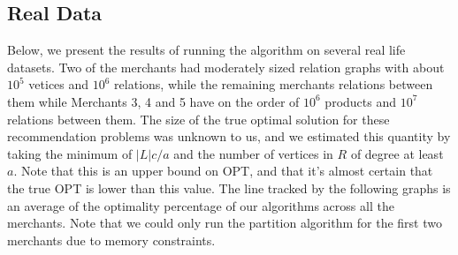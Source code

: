 \subsection{Real Data}
Below, we present the results of running the algorithm on several real life datasets. Two of the merchants had moderately sized relation graphs with about $10^5$ vetices and $10^6$ relations, while the remaining merchants relations between them while Merchants 3, 4 and 5 have on the order of $10^6$ products and $10^7$ relations between them. The size of the true optimal solution for these recommendation problems was unknown to us, and we estimated this quantity by taking the minimum of $|L|c/a$ and the number of vertices in $R$ of degree at least $a$. Note that this is an upper bound on OPT, and that it's almost certain that the true OPT is lower than this value. The line tracked by the following graphs is an average of the optimality percentage of our algorithms across all the merchants. Note that we could only run the partition algorithm for the first two merchants due to memory constraints. 

